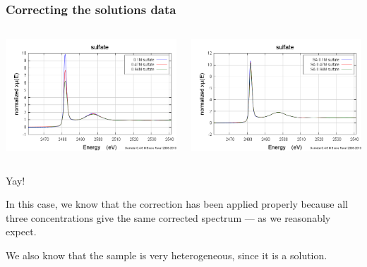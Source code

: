 \documentclass[10pt, xcolor=x11names, compress]{beamer}
\begin{document}
\begin{frame}
  \frametitle{Correcting the solutions data}
  \begin{columns}
    \begin{column}{0.5\linewidth}
      \includegraphics[width=\linewidth]{images/sulfate.png}      
    \end{column}
    \begin{column}{0.5\linewidth}
      \includegraphics[width=\linewidth]{images/sulfate_sa.png}      
    \end{column}
  \end{columns}
  \begin{center}
    Yay!
  \end{center}

  \begin{exampleblock}{}
    In this case, we know that the correction has been applied
    properly because all three concentrations give the same corrected
    spectrum --- as we reasonably expect.

    \medskip

    We also know that the sample is very heterogeneous, since it is a
    solution.
  \end{exampleblock}

\end{frame}
\end{document}
